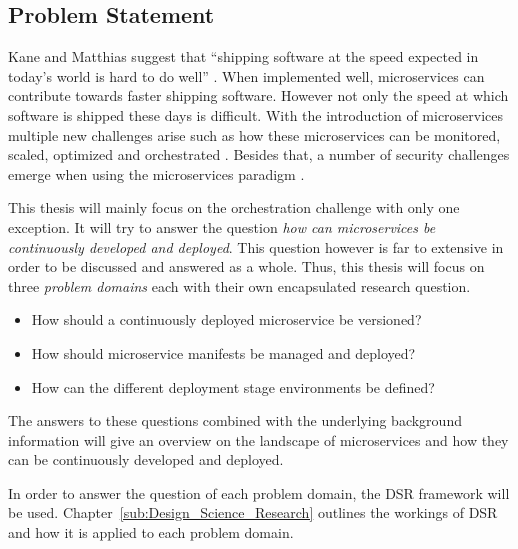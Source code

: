 
\subsection{Problem Statement}%
\label{sub:Problem_Statement}

Kane and Matthias suggest that \enquote{shipping software at the speed expected
in today's world is hard to do well} \autocite[p.
2]{SeanPKaneDocker&Running2018}. When implemented well, microservices can
contribute towards faster shipping software. However not only the speed at
which software is shipped these days is difficult. With the introduction of
microservices multiple new challenges arise such as how these microservices can
be monitored, scaled, optimized and orchestrated \autocite[p.
67]{TrihinasDevOpsasService2018}. Besides that, a number of security challenges
emerge when using the microservices paradigm
\autocite{YaryginaOvercomingSecurityChallenges2018}.

This thesis will mainly focus on the orchestration challenge with only one
exception. It will try to answer the question \textit{how can microservices be
continuously developed and deployed}. This question however is far to extensive
in order to be discussed and answered as a whole. Thus, this thesis will focus
on three  \textit{problem domains} each with their own encapsulated research
question.

\label{link:problem_domains}
\begin{itemize}
  \item How should a continuously deployed microservice be versioned?
  \item How should microservice manifests be managed and deployed?
  \item How can the different deployment stage environments be defined?
\end{itemize}

The answers to these questions combined with the underlying background
information will give an overview on the landscape of microservices and how
they can be continuously developed and deployed.

In order to answer the question of each problem domain, the \ac{DSR} framework
will be used. Chapter~\ref{sub:Design_Science_Research} outlines the workings
of \ac{DSR} and how it is applied to each problem domain.
